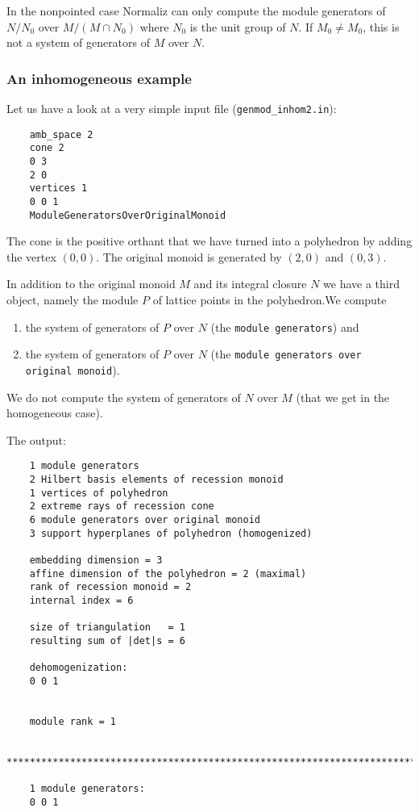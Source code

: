 \documentclass[12pt,a4paper]{scrartcl}
\theoremstyle{definition}
\begin{document}
{	In the nonpointed case Normaliz can only compute the module generators of $N/N_0$ over $M/(M\cap N_0)$ where $N_0$ is the unit group of $N$. If $M_0\neq M_0$, this is not a system of generators of $M$ over $N$.
	
	\subsubsection{An inhomogeneous example}
	
	Let us have a look at a very simple input file (\verb|genmod_inhom2.in|):
	\begin{Verbatim}
	amb_space 2
	cone 2
	0 3
	2 0
	vertices 1
	0 0 1
	ModuleGeneratorsOverOriginalMonoid
	\end{Verbatim}
	
	The cone is the positive orthant that we have turned into a polyhedron by adding the vertex $(0,0)$. The original monoid is generated by $(2,0)$ and $(0,3)$. 
	
	In addition to the original monoid $M$ and its integral closure $N$ we have a third object, namely the module $P$ of lattice points in the polyhedron.We compute
	\begin{enumerate}
		\item the system of generators of $P$ over $N$ (the \verb|module generators|) and
		\item the system of generators of $P$ over $N$ (the \verb|module generators over original monoid|). 
	\end{enumerate}
	We do not compute the system of generators of $N$ over $M$ (that we get in the homogeneous case).
	
	The output:
	\begin{Verbatim}
	1 module generators
	2 Hilbert basis elements of recession monoid
	1 vertices of polyhedron
	2 extreme rays of recession cone
	6 module generators over original monoid
	3 support hyperplanes of polyhedron (homogenized)
	
	embedding dimension = 3
	affine dimension of the polyhedron = 2 (maximal)
	rank of recession monoid = 2
	internal index = 6
	
	size of triangulation   = 1
	resulting sum of |det|s = 6
	
	dehomogenization:
	0 0 1 
	
	
	module rank = 1
	
	***********************************************************************
	
	1 module generators:
	0 0 1
	

\end{Verbatim}}
\end{document}
